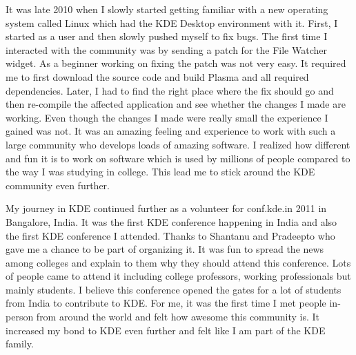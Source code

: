 

\noindent{}It was late 2010 when I slowly started getting familiar with a new operating system called Linux which had the KDE Desktop environment with it. First, I started as a user and then slowly pushed myself to fix bugs. The first time I interacted with the community was by sending a patch for the File Watcher widget. As a beginner working on fixing the patch was not very easy. It required me to first download the source code and build Plasma and all required dependencies. Later, I had to find the right place where the fix should go and then re-compile the affected application and see whether the changes I made are working. Even though the changes I made were really small the experience I gained was not. It was an amazing feeling and experience to work with such a large community who develops loads of amazing software. I realized how different and fun it is to work on software which is used by millions of people compared to the way I was studying in college. This lead me to stick around the KDE community even further.

My journey in KDE continued further as a volunteer for conf.kde.in 2011 in Bangalore, India. It was the first KDE conference happening in India and also the first KDE conference I attended. Thanks to Shantanu and Pradeepto who gave me a chance to be part of organizing it. It was fun to spread the news among colleges and explain to them why they should attend this conference. Lots of people came to attend it including college professors, working professionals but mainly students. I believe this conference opened the gates for a lot of students from India to contribute to KDE. For me, it was the first time I met people in-person from around the world and felt how awesome this community is. It increased my bond to KDE even further and felt like I am part of the KDE family.

